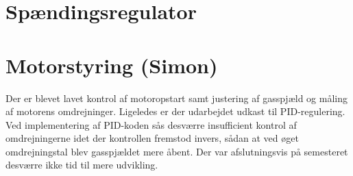 \section{Spændingsregulator}
\label{sec:spandingsregulator}





\section{Motorstyring (Simon)}
\label{sec:motorstyring-2} 

Der er blevet lavet kontrol af motoropstart samt justering af gasspjæld og måling af motorens omdrejninger. Ligeledes er der udarbejdet udkast til PID-regulering. Ved implementering af PID-koden sås desværre insufficient kontrol af omdrejningerne idet der kontrollen fremstod invers, sådan at ved øget omdrejningstal blev gasspjældet mere åbent. Der var afslutningsvis på semesteret desværre ikke tid til mere udvikling.


% 

\clearpage


% 

% 

% 

% 

% 

% 

% 

